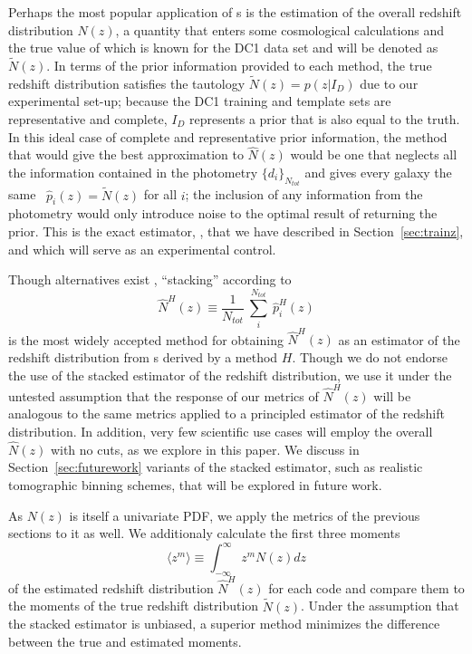 Perhaps the most popular application of \pzpdf s is the estimation of the overall redshift distribution $N(z)$, a quantity that enters some cosmological calculations and the true value of which is known for the DC1 data set and will be denoted as $\tilde{N}(z)$.
In terms of the prior information provided to each method, the true redshift distribution satisfies the tautology $\tilde{N}(z) = p(z \vert I_{D})$ due to our experimental set-up; because the DC1 training and template sets are representative and complete, $I_{D}$ represents a prior that is also equal to the truth.
In this ideal case of complete and representative prior information, the method that would give the best approximation to $\hat{N}(z)$ would be one that neglects all the information contained in the photometry $\{d_{i}\}_{N_{tot}}$ and gives every galaxy the same \pzpdf\ $\hat{p}_{i}(z) = \tilde{N}(z)$ for all $i$; the inclusion of any information from the photometry would only introduce noise to the optimal result of returning the prior.
This is the exact estimator, \trainz, that we have described in Section~\ref{sec:trainz}, and which will serve as an experimental control.

Though alternatives exist \citep{Malz:chippr}, ``stacking'' according to
\begin{equation}
  \label{eq:stacked}
  \hat{N}^{H}(z) \equiv \frac{1}{N_{tot}}\ \sum_{i}^{N_{tot}}\ \hat{p}^{H}_{i}(z)
\end{equation}
is the most widely accepted method for obtaining $\hat{N}^{H}(z)$ as an estimator of the redshift distribution from \pzpdf s derived by a method $H$.
Though we do not endorse the use of the stacked estimator of the redshift distribution, we use it under the untested assumption that the response of our metrics of $\hat{N}^{H}(z)$ will be analogous to the same metrics applied to a principled estimator of the redshift distribution.
In addition, very few scientific use cases will employ the overall $\hat{N}(z)$ with no cuts, as we explore in this paper.
We discuss in Section~\ref{sec:futurework} variants of the stacked estimator, such as realistic tomographic binning schemes, that will be explored in future work.

As $N(z)$ is itself a univariate PDF, we apply the metrics of the previous sections to it as well.
We additionaly calculate the first three moments
\begin{equation}
  \label{eq:moment}
  \langle z^{m}\rangle \equiv \int_{-\infty}^{\infty} z^{m} N(z) dz
\end{equation}
of the estimated redshift distribution $\hat{N}^{H}(z)$ for each code and compare them to the moments of the true redshift distribution $\tilde{N}(z)$.
Under the assumption that the stacked estimator is unbiased, a superior method minimizes the difference between the true and estimated moments.
